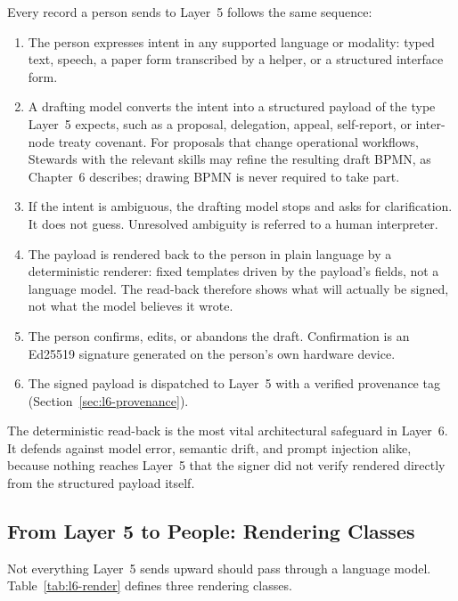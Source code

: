Every record a person sends to Layer~5 follows the same sequence:
\begin{enumerate}
  \item The person expresses intent in any supported language or modality: typed text, speech, a paper form transcribed by a helper, or a structured interface form.
  \item A drafting model converts the intent into a structured payload of the type Layer~5 expects, such as a proposal, delegation, appeal, self-report, or inter-node treaty covenant. For proposals that change operational workflows, Stewards with the relevant skills may refine the resulting draft BPMN, as Chapter~6 describes; drawing BPMN is never required to take part.
  \item If the intent is ambiguous, the drafting model stops and asks for clarification. It does not guess. Unresolved ambiguity is referred to a human interpreter.
  \item The payload is rendered back to the person in plain language by a deterministic renderer: fixed templates driven by the payload's fields, not a language model. The read-back therefore shows what will actually be signed, not what the model believes it wrote.
  \item The person confirms, edits, or abandons the draft. Confirmation is an Ed25519 signature generated on the person's own hardware device.
  \item The signed payload is dispatched to Layer~5 with a verified provenance tag (Section~\ref{sec:l6-provenance}).
\end{enumerate}
The deterministic read-back is the most vital architectural safeguard in Layer~6. It defends against model error, semantic drift, and prompt injection alike, because nothing reaches Layer~5 that the signer did not verify rendered directly from the structured payload itself.

\subsection{From Layer 5 to People: Rendering Classes}

Not everything Layer~5 sends upward should pass through a language model. Table~\ref{tab:l6-render} defines three rendering classes.

